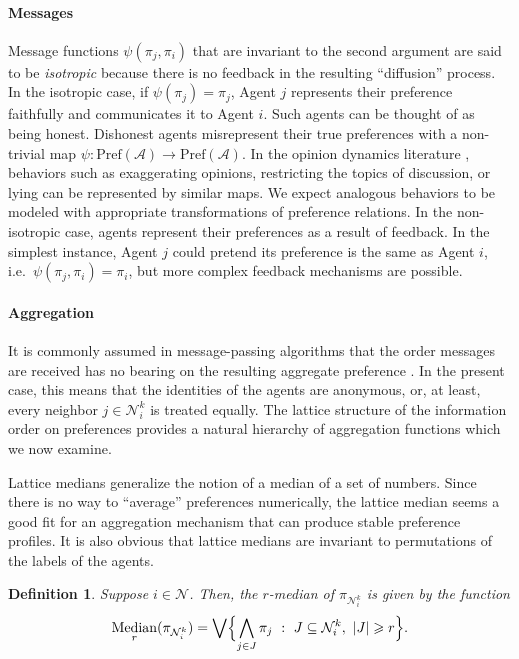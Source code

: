 \documentclass[conference]{ieeeconf}
\newcommand{\N}{\mathcal{N}}
\newcommand{\A}{\mathcal{A}}
\newcommand{\Pref}{\mathrm{Pref}}
\newcommand{\bigjoin}{\bigvee}
\newcommand{\bigmeet}{\bigwedge}
\renewcommand{\geq}{\geqslant}
\DeclareMathOperator{\Median}{Median}
\newtheorem{definition}{Definition}
\begin{document}
\paragraph*{Messages}
Message functions $\psi(\pi_j,\pi_i)$ that are invariant to the second argument are said to be \emph{isotropic} because there is no feedback in the resulting ``diffusion'' process. In the isotropic case, if $\psi(\pi_j) = \pi_j$, Agent $j$ represents their preference faithfully and communicates it to Agent $i$. Such agents can be thought of as being honest. Dishonest agents misrepresent their true preferences with a non-trivial map $\psi: \Pref(\A) \to \Pref(\A)$. In the opinion dynamics literature \cite{hansen2021}, behaviors such as exaggerating opinions, restricting the topics of discussion, or lying can be represented by similar maps. We expect analogous behaviors to be modeled with appropriate transformations of preference relations. In the non-isotropic case, agents represent their preferences as a result of feedback. In the simplest instance, Agent $j$ could pretend its preference is the same as Agent $i$, i.e.~$\psi(\pi_j,\pi_i) = \pi_i$, but more complex feedback mechanisms are possible.

\paragraph*{Aggregation}
It is commonly assumed in message-passing algorithms that the order messages are received has no bearing on the resulting aggregate preference \cite{?}. In the present case, this means that the identities of the agents are anonymous, or, at least, every neighbor $j \in \N_i^k$ is treated equally. The lattice structure of the information order on preferences provides a natural hierarchy of aggregation functions which we now examine.

Lattice medians generalize the notion of a median of a set of numbers. Since there is no way to ``average'' preferences numerically, the lattice median seems a good fit for an aggregation mechanism that can produce stable preference profiles. It is also obvious that lattice medians are invariant to permutations of the labels of the agents.
\begin{definition}
    Suppose $i \in \N$. Then, the $r$-\emph{median} of  $\pi_{\N_i^k}$ is given by the function
\begin{align}
    \Median_r(\pi_{\N_i^k}) = \bigjoin \Bigl\{ \bigmeet_{j \in J} \pi_j~:~J \subseteq \N_i^k,~|J| \geq r \Bigr\}.
\end{align}
\end{definition}
\end{document}
